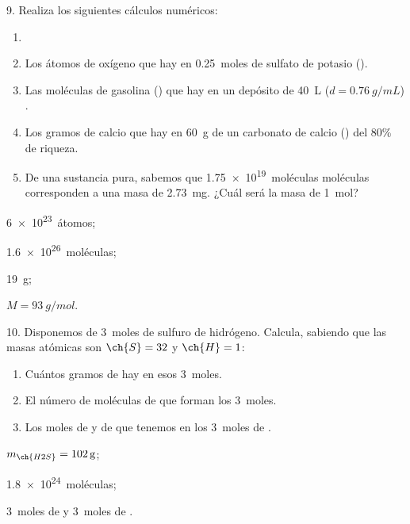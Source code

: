 \documentclass[10pt]{article}
\begin{document}
\begin{multicols}{2}
\begin{exercise}
  9. Realiza los siguientes cálculos numéricos:
  \begin{enumerate}
    \item
    \item Los átomos de oxígeno que hay en \SI{0.25}{moles} de sulfato
    de potasio ().
    \item Las moléculas de gasolina () que hay en un depósito
    de \SI{40}{\liter} ($d = \SI{0.76}{g/mL}$) .
    \item Los gramos de calcio que hay en \SI{60}{g} de un carbonato de
    calcio () del 80\% de riqueza.
    \item De una sustancia pura, sabemos que \SI{1.75e19}{moléculas} moléculas
    corresponden a una masa de \SI{2.73}{mg}. ¿Cuál será la masa de \SI{1}{mol}?
  \end{enumerate}
\end{exercise}
\begin{solution}
  \begin{enumerate*}
    \item \SI{6e23}{átomos}; \item \SI{1.6e26}{moléculas}; \item \SI{19}{g}; \item $M = \SI{93}{g/mol}$.
  \end{enumerate*}
\end{solution}

\begin{exercise}
  10. Disponemos de \SI{3}{moles} de sulfuro de hidrógeno. Calcula,
  sabiendo que las masas atómicas son $\ch{S} = 32$ y $\ch{H} = 1$:
  \begin{enumerate}
    \item Cuántos gramos de  hay en esos \SI{3}{moles}.
    \item El número de moléculas de  que forman los \SI{3}{moles}.
    \item Los moles de  y de  que tenemos en los \SI{3}{moles} de .
  \end{enumerate}
\end{exercise}
\begin{solution}
  \begin{enumerate*}
    \item $m_{\ch{H2S}} = \SI{102}{\gram}$;
    \item \SI{1.8e24}{moléculas};
    \item \SI{3}{moles} de  y \SI{3}{moles} de .
  \end{enumerate*}
\end{solution}


\end{multicols}
\end{document}
